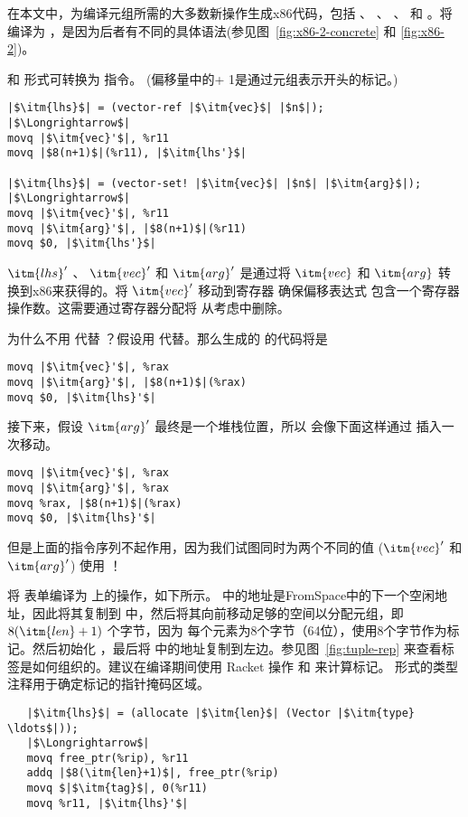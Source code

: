\documentclass[11pt]{book}
\begin{document}

在本文中，为编译元组所需的大多数新操作生成x86代码，包括  、
 、  、  和
 。将  编译为  ，是因为后者有不同的具体语法(参见图~\ref{fig:x86-2-concrete} 和 \ref{fig:x86-2})。

  和  形式可转换为
 指令。 (偏移量中的+ 1是通过元组表示开头的标记。)
\begin{lstlisting}
|$\itm{lhs}$| = (vector-ref |$\itm{vec}$| |$n$|);
|$\Longrightarrow$|
movq |$\itm{vec}'$|, %r11
movq |$8(n+1)$|(%r11), |$\itm{lhs'}$|

|$\itm{lhs}$| = (vector-set! |$\itm{vec}$| |$n$| |$\itm{arg}$|);
|$\Longrightarrow$|
movq |$\itm{vec}'$|, %r11
movq |$\itm{arg}'$|, |$8(n+1)$|(%r11)
movq $0, |$\itm{lhs'}$|
\end{lstlisting}
 $\itm{lhs}'$ 、 $\itm{vec}'$ 和 $\itm{arg}'$ 是通过将 $\itm{vec}$ 和 $\itm{arg}$ 转换到x86来获得的。将 $\itm{vec}'$ 移动到寄存器  确保偏移表达式  包含一个寄存器操作数。这需要通过寄存器分配将  从考虑中删除。

为什么不用  代替  ？假设用 代替。那么生成的  的代码将是
\begin{lstlisting}
movq |$\itm{vec}'$|, %rax
movq |$\itm{arg}'$|, |$8(n+1)$|(%rax)
movq $0, |$\itm{lhs}'$|
\end{lstlisting}
接下来，假设 $\itm{arg}'$ 最终是一个堆栈位置，所以
 会像下面这样通过 
插入一次移动。
\begin{lstlisting}
movq |$\itm{vec}'$|, %rax
movq |$\itm{arg}'$|, %rax
movq %rax, |$8(n+1)$|(%rax)
movq $0, |$\itm{lhs}'$|
\end{lstlisting}
但是上面的指令序列不起作用，因为我们试图同时为两个不同的值 ($\itm{vec}'$ 和
$\itm{arg}'$) 使用  ！

将  表单编译为
 上的操作，如下所示。 
中的地址是FromSpace中的下一个空闲地址，因此将其复制到
 中，然后将其向前移动足够的空间以分配元组，即 $8(\itm{len}+1)$ 个字节，因为 每个元素为8个字节（64位），使用8个字节作为标记。然后初始化  ，最后将  中的地址复制到左边。参见图~\ref{fig:tuple-rep} 来查看标签是如何组织的。建议在编译期间使用 Racket 操作
 和  来计算标记。  形式的类型注释用于确定标记的指针掩码区域。
\begin{lstlisting}
   |$\itm{lhs}$| = (allocate |$\itm{len}$| (Vector |$\itm{type} \ldots$|));
   |$\Longrightarrow$|
   movq free_ptr(%rip), %r11
   addq |$8(\itm{len}+1)$|, free_ptr(%rip)
   movq $|$\itm{tag}$|, 0(%r11)
   movq %r11, |$\itm{lhs}'$|
\end{lstlisting}
\end{document}
